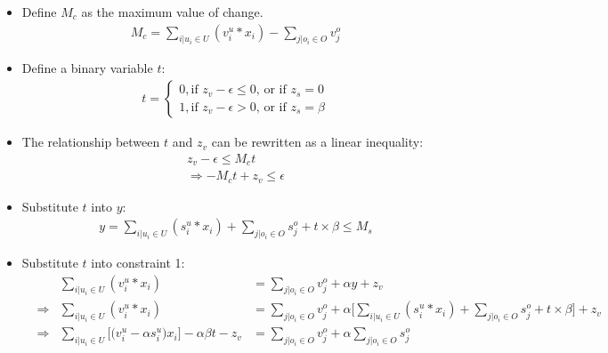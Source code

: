 \begin{itemize}
  \item Define $M_c$ as the maximum value of change.
  \begin{align*}
M_{c} = \sum\limits_{i|u_i \in U} (v_i^u * x_i) - \sum\limits_{j|o_i \in O} v_j^o
  \end{align*}

  \item Define a binary variable $t$:
  \begin{align*}
    t =
    \begin{cases}
        0, \text{if $z_v - \epsilon \leq 0$, or if $z_s = 0$}\\
        1, \text{if $z_v - \epsilon > 0$, or if $z_s = \beta$}
    \end{cases}
  \end{align*}

  \item The relationship between $t$ and $z_v$ can be rewritten as a linear inequality:
  \begin{align*}
    z_v - \epsilon \leq M_c t \\
\Rightarrow
    - M_c t + z_v \leq \epsilon
  \end{align*}

  \item Substitute $t$ into $y$:
  \begin{align*}
y = \sum\limits_{i|u_i \in U} (s_i^u * x_i) + \sum\limits_{j|o_i \in O} s_j^o + t \times \beta \leq M_s
  \end{align*}

  \item Substitute $t$ into constraint 1:
  \begin{align*}
    &&\sum\limits_{i|u_i \in U} (v_i^u * x_i)
    &=
    \sum\limits_{j|o_i \in O} v_j^o + \alpha y + z_v \\
&\Rightarrow
    &\sum\limits_{i|u_i \in U} (v_i^u * x_i)
    &=
    \sum\limits_{j|o_i \in O} v_j^o + \alpha \bigg[\sum\limits_{i|u_i \in U} (s_i^u * x_i) + \sum\limits_{j|o_i \in O} s_j^o + t \times \beta\bigg] + z_v \\
&\Rightarrow
    &\sum\limits_{i|u_i \in U} \bigg[\bigg(v_i^u - \alpha s_i^u\bigg) x_i \bigg] - \alpha \beta t - z_v
    &=
    \sum\limits_{j|o_i \in O} v_j^o + \alpha \sum\limits_{j|o_i \in O} s_j^o \\
  \end{align*}

\end{itemize}

